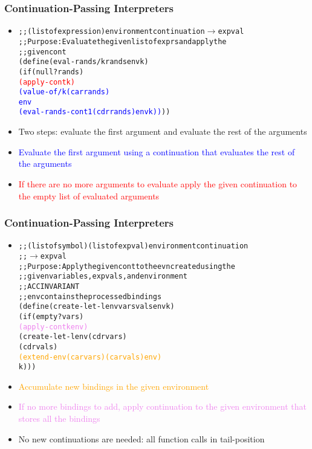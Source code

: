 \documentclass{beamer}
\newcommand{\arrow}{\(\rightarrow\)}
\newcommand{\elist}{\texttt{\textquotesingle{()}}}
\begin{document}
\begin{frame}[fragile]
\frametitle{Continuation-Passing Interpreters}
\begin{scriptsize}
\begin{itemize}
\item<1-> 
\begin{alltt}
;; (listof expression) environment continuation \arrow{} expval
;; Purpose: Evaluate the given list of exprs and apply the 
;;          given cont
(define (eval-rands/k rands env k)
  (if (null? rands)
      \textcolor{red}{(apply-cont k \elist{})}
      \textcolor{blue}{(value-of/k (car rands) 
                  env 
                  (eval-rands-cont1 (cdr rands) env k))}))
\end{alltt}

\item<1-> Two steps: evaluate the first argument and evaluate the rest of the arguments

\item<2-> \textcolor{blue}{Evaluate the first argument using a continuation that evaluates the rest of the arguments}
    
\item<3-> \textcolor{red}{If there are no more arguments to evaluate apply the given continuation to the empty list of evaluated arguments}

\end{itemize}
\end{scriptsize}
\end{frame}

\begin{frame}[fragile]
\frametitle{Continuation-Passing Interpreters}
\begin{scriptsize}
\begin{itemize}
\item<1->
\begin{alltt}
;; (listof symbol) (listof expval) environment continuation
;; \arrow{} expval
;; Purpose: Apply the given cont to the evn created using the 
;;          given variables, expvals, and environment
;; ACC INVARIANT
;;  env contains the processed bindings
(define (create-let-lenv vars vals env k)
  (if (empty? vars)
      \textcolor{violet}{(apply-cont k env)}
      (create-let-lenv (cdr vars)
                       (cdr vals)
                       \textcolor{orange}{(extend-env (car vars) (car vals) env)}
                       k)))
\end{alltt}

\item<1-> \textcolor{orange}{Accumulate new bindings in the given environment}
    
\item<2-> \textcolor{violet}{If no more bindings to add, apply continuation to the given environment that stores all the bindings}

\item<3-> No new continuations are needed: all function calls in tail-position

\end{itemize}
\end{scriptsize}
\end{frame}
\end{document}
